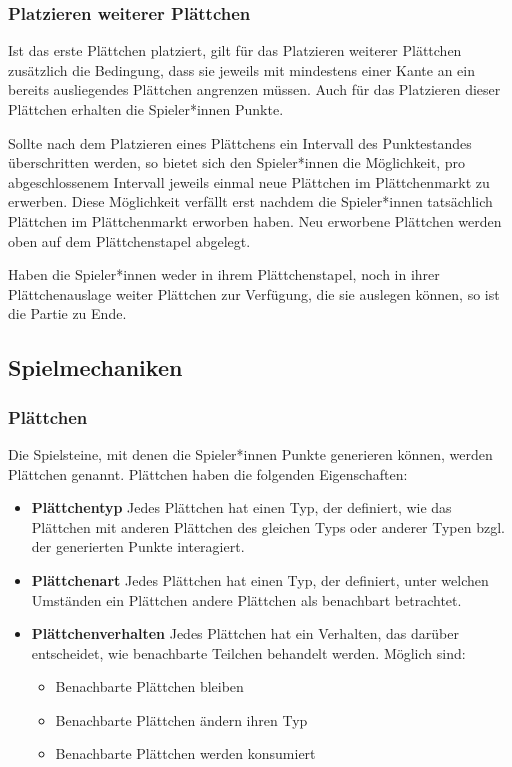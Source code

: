 \documentclass[../main.tex]{subfiles}
\begin{document}
	\subsubsection{Platzieren weiterer Plättchen}
	\par Ist das erste Plättchen platziert, gilt für das Platzieren weiterer Plättchen zusätzlich die Bedingung, dass sie jeweils mit mindestens einer Kante an ein bereits ausliegendes Plättchen angrenzen müssen. Auch für das Platzieren dieser Plättchen erhalten die Spieler*innen Punkte.
	\par Sollte nach dem Platzieren eines Plättchens ein Intervall des Punktestandes überschritten werden, so bietet sich den Spieler*innen die Möglichkeit, pro abgeschlossenem Intervall jeweils einmal neue Plättchen im Plättchenmarkt zu erwerben. Diese Möglichkeit verfällt erst nachdem die Spieler*innen tatsächlich Plättchen im Plättchenmarkt erworben haben. Neu erworbene Plättchen werden oben auf dem Plättchenstapel abgelegt.
	\par Haben die Spieler*innen weder in ihrem Plättchenstapel, noch in ihrer Plättchenauslage weiter Plättchen zur Verfügung, die sie auslegen können, so ist die Partie zu Ende.

	\subsection{Spielmechaniken}
	\label{section:Spielmechaniken}
	\subsubsection{Plättchen}
	\par Die Spielsteine, mit denen die Spieler*innen Punkte generieren können, werden Plättchen genannt. Plättchen haben die folgenden Eigenschaften:
	\begin{itemize}
		\item \textbf{Plättchentyp} Jedes Plättchen hat einen Typ, der definiert, wie das Plättchen mit anderen Plättchen des gleichen Typs oder anderer Typen bzgl. der generierten Punkte interagiert.
		\item \textbf{Plättchenart} Jedes Plättchen hat einen Typ, der definiert, unter welchen Umständen ein Plättchen andere Plättchen als benachbart betrachtet.
		\item \textbf{Plättchenverhalten} Jedes Plättchen hat ein Verhalten, das darüber entscheidet, wie benachbarte Teilchen behandelt werden. Möglich sind:
		\begin{itemize}
			\item Benachbarte Plättchen bleiben
			\item Benachbarte Plättchen ändern ihren Typ
			\item Benachbarte Plättchen werden konsumiert 
		\end{itemize}
	\end{itemize}
\end{document}
